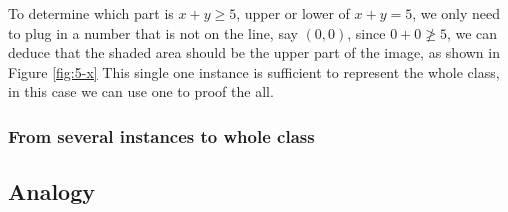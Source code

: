 To determine which part is $ x + y \geqslant 5$, upper or lower of $ x + y = 5$, we only need to plug in a number that is not on the line, say $(0, 0)$, since $0+ 0 \ngeqslant 5$, we can deduce that the shaded area should be the upper part of the image, as shown in Figure \ref{fig:5-x} This single one instance is sufficient to represent the whole class, in this case we can use one to proof the all.

\subsubsection*{From several instances to whole class}



\subsection{Analogy}


